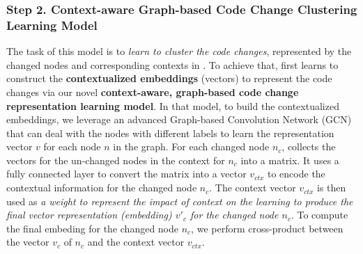 
\subsubsection{{\bf Step 2. Context-aware Graph-based Code Change Clustering Learning Model}} The task of this model is to {\em learn to cluster the code changes}, represented by
the changed nodes and corresponding contexts in {\mvpdg}. To achieve
that, {\tool} first learns to construct the {\bf contextualized
  embeddings} (vectors) to represent the code changes via our novel
{\bf context-aware, graph-based code change representation learning
  model}. In that model, to build the contextualized embeddings, we
leverage an advanced Graph-based Convolution Network (GCN)~\cite{yi}
that can deal with the nodes with different labels to learn the
representation vector $v$ for each node $n$ in the graph. For each
changed node $n_c$, {\tool} collects the vectors for the un-changed
nodes in the context for $n_c$ into a matrix. It uses a fully
connected layer to convert the matrix into a vector $v_{ctx}$ to
encode the contextual information for the changed node $n_c$. The
context vector $v_{ctx}$ is then used as {\em a weight to represent
  the impact of context on the learning to produce the final vector
  representation (embedding) $v'_c$ for the changed node $n_c$}. To
compute the final embeding for the changed node $n_c$, we perform
cross-product between the vector $v_c$ of $n_c$ and the context vector
$v_{ctx}$.


